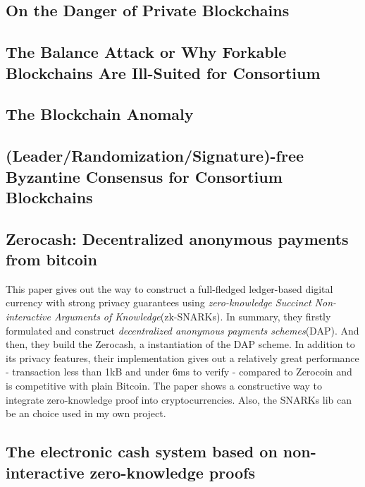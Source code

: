 \subsection{On the Danger of Private Blockchains\cite{Gra16}}



\subsection{The Balance Attack or Why Forkable Blockchains Are Ill-Suited for Consortium\cite{NG17}}

\subsection{The Blockchain Anomaly\cite{NG16}}

\subsection{(Leader/Randomization/Signature)-free Byzantine Consensus for Consortium Blockchains\cite{DBLP:journals/corr/CrainGLR17}}

\subsection{Zerocash: Decentralized anonymous payments from bitcoin\cite{sasson2014zerocash}}

This paper gives out the way to construct a full-fledged ledger-based digital currency with strong 
privacy guarantees using \textit{zero-knowledge Succinct Non-interactive Arguments of Knowledge}(zk-SNARKs).
In summary, they firstly formulated and construct \textit{decentralized anonymous payments schemes}(DAP).
And then, they build the Zerocash, a instantiation of the DAP scheme. In addition to its privacy
features, their implementation gives out a relatively great performance - transaction less than 1kB and 
under 6ms to verify - compared to Zerocoin and is competitive with plain Bitcoin. The paper shows a
constructive way to integrate zero-knowledge proof into cryptocurrencies. Also, the SNARKs lib can be an 
choice used in my own project.

\subsection{The electronic cash system based on non-interactive zero-knowledge proofs\cite{doi:10.1080/00207160.2014.933816}}

